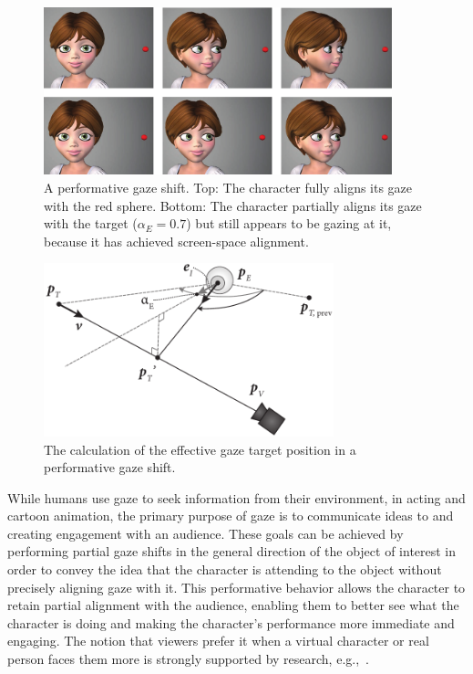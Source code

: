 \begin{figure}
\centering
\includegraphics[width=0.9\textwidth]{stylizedgaze/Figures/PerformativeGazeExample-small.pdf}
\caption{A performative gaze shift. Top: The character fully aligns its gaze with the red sphere. Bottom: The character partially aligns its gaze with the target ($\alpha_E = 0.7$) but still appears to be gazing at it, because it has achieved screen-space alignment.}
\label{fig:PerformativeGazeExample}
\end{figure}

\begin{figure}
\centering
\includegraphics[width=0.75\textwidth]{stylizedgaze/Figures/EyeAlignment.pdf}
\caption{The calculation of the effective gaze target position in a performative gaze shift.}
\label{fig:EyeAlignment}
\end{figure}

While humans use gaze to seek information from their environment, in acting and cartoon animation, the primary purpose of gaze is to communicate ideas to and creating engagement with an audience. These goals can be achieved by performing partial gaze shifts in the general direction of the object of interest in order to convey the idea that the character is attending to the object without precisely aligning gaze with it. This performative behavior allows the character to retain partial alignment with the audience, enabling them to better see what the character is doing and making the character's performance more immediate and engaging. The notion that viewers prefer it when a virtual character or real person faces them more is strongly supported by research, e.g.,~\citep{beebe1976effects,andrist2012designing}.

